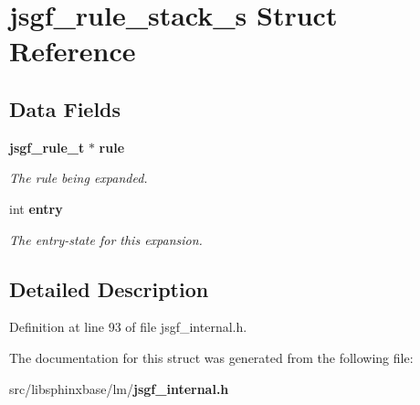 \section{jsgf\-\_\-rule\-\_\-stack\-\_\-s Struct Reference}
\label{structjsgf__rule__stack__s}
\subsection*{Data Fields}
\begin{DoxyCompactItemize}
\item 
{\bf jsgf\-\_\-rule\-\_\-t} $\ast$ {\bf rule}\label{structjsgf__rule__stack__s_a5fd5facd2b790c949ef2efa80b07148a}

\begin{DoxyCompactList}\small\item\em The rule being expanded. \end{DoxyCompactList}\item 
int {\bf entry}\label{structjsgf__rule__stack__s_a56107dc6cc50d45a5c1811785e8169b7}

\begin{DoxyCompactList}\small\item\em The entry-\/state for this expansion. \end{DoxyCompactList}\end{DoxyCompactItemize}


\subsection{Detailed Description}


Definition at line 93 of file jsgf\-\_\-internal.\-h.



The documentation for this struct was generated from the following file\-:\begin{DoxyCompactItemize}
\item 
src/libsphinxbase/lm/{\bf jsgf\-\_\-internal.\-h}\end{DoxyCompactItemize}
